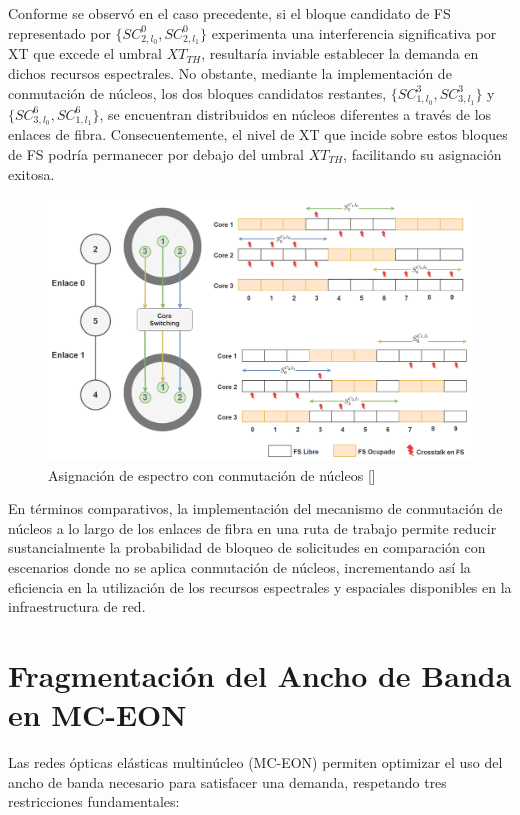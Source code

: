 Conforme se observó en el caso precedente, si el bloque candidato de FS representado por $\{SC_{2,l_0}^0, SC_{2,l_1}^0\}$ experimenta una interferencia significativa por XT que excede el umbral $XT_{TH}$, resultaría inviable establecer la demanda en dichos recursos espectrales. No obstante, mediante la implementación de conmutación de núcleos, los dos bloques candidatos restantes, $\{SC_{1,l_0}^3, SC_{3,l_1}^3\}$ y $\{SC_{3,l_0}^6, SC_{1,l_1}^6\}$, se encuentran distribuidos en núcleos diferentes a través de los enlaces de fibra. Consecuentemente, el nivel de XT que incide sobre estos bloques de FS podría permanecer por debajo del umbral $XT_{TH}$, facilitando su asignación exitosa.


\begin{figure}[H]
    \centering
    \includegraphics[width=1\textwidth]{capitulos/img/ASIGNACION_ESPECTRO_CON_CONMMUTACION.png}
    \caption{  Asignación de espectro con conmutación de núcleos []}
    \label{fig:ASIGNACION_ESPECTRO_CON_CONMMUTACION}
\end{figure}


En términos comparativos, la implementación del mecanismo de conmutación de núcleos a lo largo de los enlaces de fibra en una ruta de trabajo permite reducir sustancialmente la probabilidad de bloqueo de solicitudes en comparación con escenarios donde no se aplica conmutación de núcleos, incrementando así la eficiencia en la utilización de los recursos espectrales y espaciales disponibles en la infraestructura de red.




\section{Fragmentación del Ancho de Banda en MC-EON}
Las redes ópticas elásticas multinúcleo (MC-EON) permiten optimizar el uso del ancho de banda necesario para satisfacer una demanda, respetando tres restricciones fundamentales:
%

